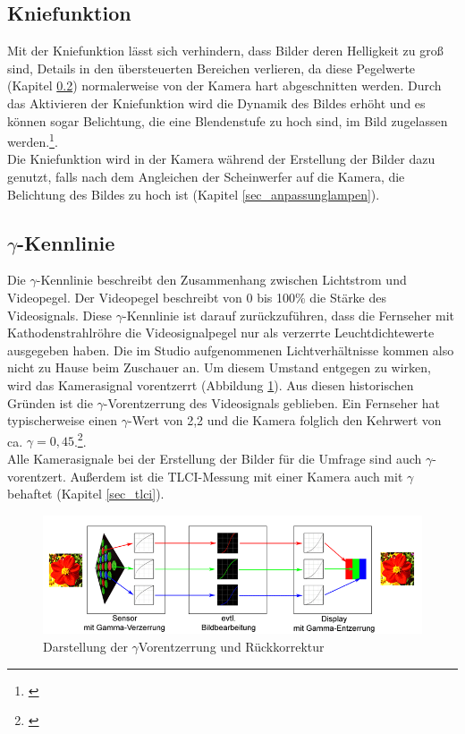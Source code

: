 \subsection{Kniefunktion}
\label{sec_knee}
Mit der Kniefunktion lässt sich verhindern, dass Bilder deren Helligkeit zu groß sind, Details in den übersteuerten Bereichen verlieren, da diese Pegelwerte (Kapitel \ref{sec_gamma}) normalerweise von der Kamera hart abgeschnitten werden. Durch das Aktivieren der Kniefunktion wird die Dynamik des Bildes erhöht und es können sogar Belichtung, die eine Blendenstufe zu hoch sind, im Bild zugelassen werden.\footnote{\cite[389]{schmidt}}.\\
Die Kniefunktion wird in der Kamera während der Erstellung der Bilder dazu genutzt, falls nach dem Angleichen der Scheinwerfer auf die Kamera, die Belichtung des Bildes zu hoch ist (Kapitel \ref{sec_anpassunglampen}).

\subsection{$\gamma$-Kennlinie}
\label{sec_gamma}
Die $\gamma$-Kennlinie beschreibt den Zusammenhang zwischen Lichtstrom und Videopegel. Der Videopegel beschreibt von 0 bis 100\% die Stärke des Videosignals. Diese $\gamma$-Kennlinie ist darauf zurückzuführen, dass die Fernseher mit Kathodenstrahlröhre die Videosignalpegel nur als verzerrte Leuchtdichtewerte ausgegeben haben. Die im Studio aufgenommenen Lichtverhältnisse kommen also nicht zu Hause beim Zuschauer an. Um diesem Umstand entgegen zu wirken, wird das Kamerasignal vorentzerrt (Abbildung \ref{b_gamma}). Aus diesen historischen Gründen ist die $\gamma$-Vorentzerrung des Videosignals geblieben. Ein Fernseher hat typischerweise einen $\gamma$-Wert von 2,2 und die Kamera folglich den Kehrwert von ca. $\gamma=0,45$.\footnote{\cite[408-409]{schmidt}}.\\
Alle Kamerasignale bei der Erstellung der Bilder für die Umfrage sind auch $\gamma$-vorentzert. Außerdem ist die TLCI-Messung mit einer Kamera auch mit $\gamma$ behaftet (Kapitel \ref{sec_tlci}).

\begin{figure}[htp]     %
\centering
\includegraphics[width=1.0\textwidth]{bilder/gamma} 
\caption {Darstellung der $\gamma$Vorentzerrung und Rückkorrektur\protect\footnotemark}\label{b_gamma}
\end{figure}


